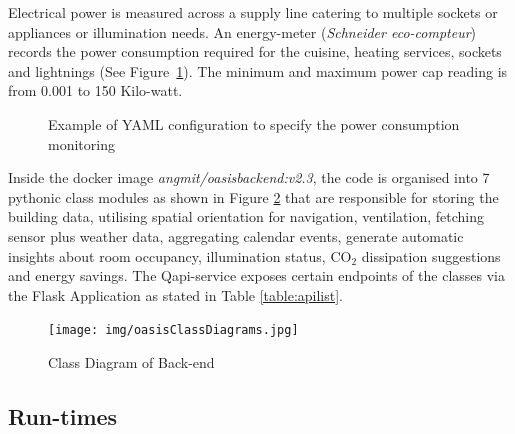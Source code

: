 Electrical power is measured across a supply line catering to multiple sockets or appliances or illumination needs. An energy-meter (\textit{Schneider eco-compteur}) records the power consumption required for the cuisine, heating services, sockets and lightnings  (See Figure~\ref{fig:yaml_elec}). The minimum and maximum power cap reading is from 0.001 to 150 Kilo-watt.
\begin{figure}[h!]
     \centering
      \caption{Example of YAML configuration to specify the power consumption monitoring}%
    \label{fig:yaml_elec}%
\end{figure}

Inside the docker image \textit{angmit/oasisbackend:v2.3}, the code is organised into 7 pythonic class modules as shown in Figure \ref{fig:oasisClassDiagram} that are responsible for storing the building data, utilising spatial orientation for navigation, ventilation, fetching sensor plus weather data, aggregating calendar events, generate automatic insights about room occupancy, illumination status, CO$_2$ dissipation suggestions and energy savings. The Qapi-service exposes certain endpoints of the classes via the Flask Application as stated in Table \ref{table:apilist}. 
\begin{figure}[h!]
    \centering
    \texttt{[image: img/oasisClassDiagrams.jpg]}
    \caption{Class Diagram of Back-end }
    \label{fig:oasisClassDiagram}
\end{figure}


\subsection{Run-times}

